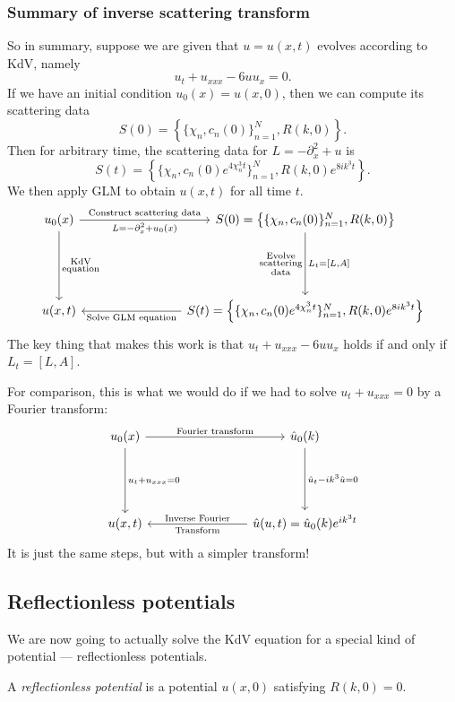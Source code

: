 \documentclass[a4paper]{article}
\begin{document}
\subsubsection{Summary of inverse scattering transform}
So in summary, suppose we are given that $u = u(x, t)$ evolves according to KdV, namely
\[
  u_t + u_{xxx} - 6uu_x = 0.
\]
If we have an initial condition $u_0(x) = u(x, 0)$, then we can compute its scattering data
\[
  S(0) = \left\{\{\chi_n, c_n(0)\}_{n = 1}^N, R(k, 0)\right\}.
\]
Then for arbitrary time, the scattering data for $L = -\partial_x^2 + u$ is
\[
  S(t) = \left\{\{\chi_n, c_n(0)e^{4\chi_n^3 t}\}_{n = 1}^N, R(k, 0)e^{8ik^3 t}\right\}.
\]
We then apply GLM to obtain $u(x, t)$ for all time $t$.
\[
  \begin{tikzcd}[row sep=5em, column sep=8em]
    u_0(x) \ar[r, "\text{Construct scattering data}", "L = -\partial_x^2 + u_0(x)"'] \ar[d, "\substack{\text{KdV}\\\text{equation}}"] & S(0) = \left\{\{\chi_n, c_n(0)\}_{n = 1}^N, R(k, 0)\right\} \ar[d, "\substack{\text{Evolve}\\\text{scattering}\\\text{data}}"', "{L_t = [L, A]}"]\\
    u(x, t) & S(t) = \left\{\{\chi_n, c_n(0)e^{4\chi_n^3 t}\}_{n = 1}^N, R(k, 0)e^{8ik^3 t}\right\} \ar[l, "\text{Solve GLM equation}"]
  \end{tikzcd}
\]
The key thing that makes this work is that $u_t + u_{xxx} - 6 uu_x$ holds if and only if $L_t = [L, A]$.

For comparison, this is what we would do if we had to solve $u_t + u_{xxx} = 0$ by a Fourier transform:
\[
  \begin{tikzcd}[row sep=5em, column sep=8em]
    u_0(x) \ar[r, "\text{Fourier transform}"] \ar[d, "u_t + u_{xxx} = 0"] & \hat{u}_0(k) \ar[d, "\hat{u}_t - ik^3 \hat{u} = 0"]\\
    u(x, t) & \hat{u}(u, t) = \hat{u}_0(k) e^{ik^3 t} \ar[l, "\text{Inverse Fourier}"', "\text{Transform}"]
  \end{tikzcd}
\]
It is just the same steps, but with a simpler transform!

\subsection{Reflectionless potentials}
We are now going to actually solve the KdV equation for a special kind of potential --- reflectionless potentials.

\begin{defi}
  A \emph{reflectionless potential} is a potential $u(x, 0)$ satisfying $R(k, 0) = 0$.
\end{defi}
\end{document}
